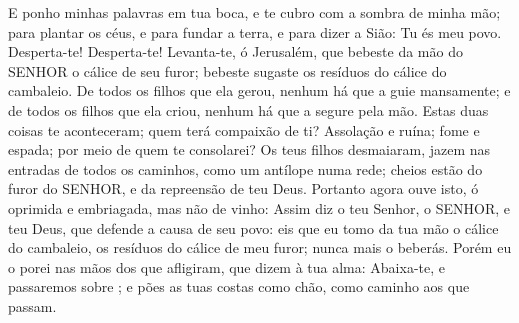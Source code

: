 {  E ponho minhas palavras em tua boca, e te cubro com a sombra de minha mão; para plantar os céus, e para fundar a terra, e para dizer a Sião: Tu és meu povo.
  Desperta-te! Desperta-te! Levanta-te, ó Jerusalém, que bebeste da mão do SENHOR o cálice de seu furor; bebeste
{} sugaste os resíduos do cálice do cambaleio.
  De todos os filhos que ela gerou, nenhum há que a guie mansamente; e de todos os filhos que ela criou, nenhum há que a segure pela mão.
  Estas duas coisas te aconteceram; quem terá compaixão de ti? Assolação e ruína; fome e espada; por meio de quem te consolarei?
  Os teus filhos desmaiaram, jazem nas entradas de todos os caminhos, como um antílope numa rede; cheios estão do furor do SENHOR, e da repreensão de teu Deus.
  Portanto agora ouve isto, ó oprimida e embriagada, mas não de vinho:
  Assim diz o teu Senhor, o SENHOR, e teu Deus, que defende a causa de seu povo: eis que eu tomo da tua mão o cálice do cambaleio, os resíduos do cálice de meu furor; nunca mais o beberás.
  Porém eu o porei nas mãos dos que afligiram, que dizem à tua alma: Abaixa-te, e passaremos sobre
{} ; e pões as tuas costas como chão, como caminho aos que passam.
\par }

